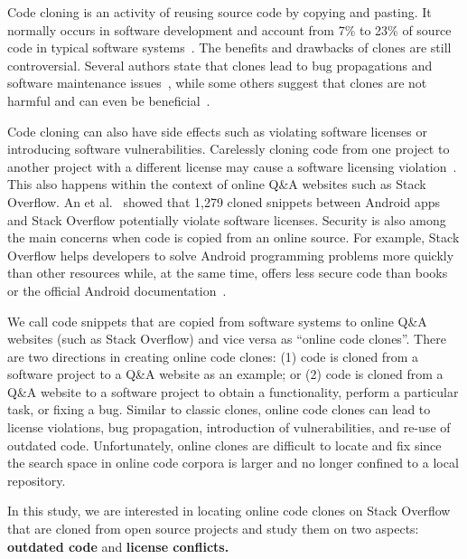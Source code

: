 \documentclass[sigconf,review, anonymous]{acmart}
\newcommand\FIXME[1]{\textbf{FIXME: #1}}
\begin{document}
Code cloning is an activity of reusing source code by copying and
pasting. It normally occurs in software development and account from
7\% to 23\% of source code in typical software
systems~\cite{Bellon2007}. The benefits and drawbacks of clones are
still controversial. Several authors state that clones lead to bug
propagations and software maintenance issues~\cite{Kamiya2002}, while
some others suggest that clones are not harmful and can even be
beneficial~\cite{Saini2016,Kapser2006}.

Code cloning can also have side effects such as violating software
licenses or introducing software vulnerabilities. Carelessly cloning
code from one project to another project with a different license may
cause a software licensing violation~\cite{German2009}. This also
happens within the context of online Q\&A websites such as Stack
Overflow. An et al.~\cite{An2017} showed that 1,279 cloned snippets
between Android apps and Stack Overflow potentially violate software
licenses. Security is also among the main concerns when code is copied
from an online source. For example, Stack Overflow helps developers to solve
Android programming problems more quickly than other resources while,
at the same time, offers less secure code than books or the official
Android documentation~\cite{Acar2016}.


We call code snippets that are copied from software systems to online
Q\&A websites (such as Stack Overflow) and vice versa as ``online
code clones''. There are two
directions in creating online code clones: (1) code is cloned from a software
project to a Q\&A website as an example; or (2) code is cloned from a
Q\&A website to a software project to obtain a functionality, perform
a particular task, or fixing a bug.
Similar to classic clones, online code clones can lead to license
violations, bug propagation, introduction of vulnerabilities, and
re-use of outdated code. Unfortunately, online clones are 
difficult to locate and fix since the search space in online code
corpora is larger and no longer confined to a local repository.

In this study, we are interested in locating online code clones on
Stack Overflow that are cloned from open source projects and study
them on two aspects: \textbf{outdated code} and \textbf{license conflicts.}
\end{document}
